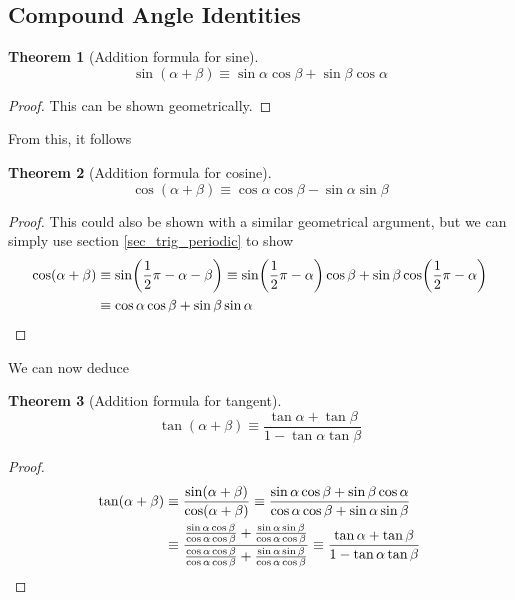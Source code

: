 \documentclass[fleqn,a4paper,11pt]{article}
\newtheorem{theorem}{Theorem}[section]
\begin{document}
    \subsection{Compound Angle Identities} \label{sec_comp_angle}


    \begin{theorem}[Addition formula for sine]
    \begin{equation*}
    \sin(\alpha + \beta) \equiv
       \sin \alpha \cos \beta +  \sin \beta \cos \alpha
    \end{equation*}
    \end{theorem}
    \begin{proof}
    This can be shown geometrically.
    \end{proof}
    From this, it follows
    \begin{theorem}[Addition formula for cosine]
    \begin{equation*}
    \cos(\alpha + \beta) \equiv
       \cos \alpha \cos \beta - \sin \alpha \sin \beta
    \end{equation*}
    \end{theorem}
    \begin{proof}
    This could also be shown with a similar geometrical argument, but we can
    simply use section \ref{sec_trig_periodic} to show
    \begin{align*}
    \cos(\alpha + \beta) &\equiv
        \sin(\frac 12 \pi - \alpha - \beta) \equiv
        \sin(\frac 12 \pi - \alpha)\cos \beta +
            \sin \beta \cos(\frac 12 \pi - \alpha) \\
    &\equiv
        \cos \alpha \cos \beta + \sin \beta \sin \alpha \qedhere
    \end{align*}
    \end{proof}
    We can now deduce
    \begin{theorem}[Addition formula for tangent]
    \begin{equation*}
    \tan(\alpha + \beta) \equiv
        \frac{\tan \alpha + \tan \beta}{1 - \tan \alpha \tan \beta}
    \end{equation*}
    \end{theorem}
    \begin{proof}
    \begin{align*}
    \tan(\alpha + \beta) &\equiv
        \frac{\sin(\alpha + \beta)}{\cos(\alpha + \beta)} \equiv
        \frac{\sin \alpha \cos \beta + \sin \beta \cos \alpha}
             {\cos \alpha \cos \beta + \sin \alpha \sin \beta} \\
        &\equiv \frac{
              \frac{\sin \alpha \cos \beta}{\cos \alpha \cos \beta} +
              \frac{\sin \alpha \sin \beta}{\cos \alpha \cos \beta}}
             {\frac{\cos \alpha \cos \beta}{\cos \alpha \cos \beta} +
              \frac{\sin \alpha \sin \beta}{\cos \alpha \cos \beta}}
             \equiv
        \frac{\tan \alpha + \tan \beta}{1 - \tan \alpha \tan \beta} \qedhere
    \end{align*}
    \end{proof}
\end{document}
